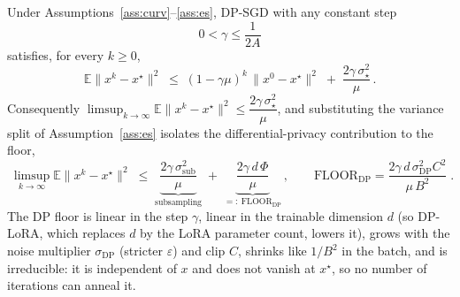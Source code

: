 \begin{theorem}\label{thm:floor}
Under Assumptions~\ref{ass:curv}--\ref{ass:es}, DP-SGD with any constant step
\[
0<\gamma\le\frac{1}{2A}
\]
satisfies, for every $k\ge0$,
\[
\mathbb E\|x^k-x^\star\|^2\;\le\;(1-\gamma\mu)^k\,\|x^0-x^\star\|^2\;+\;\frac{2\gamma\,\sigma_\star^2}{\mu}\,.
\]
Consequently $\limsup_{k\to\infty}\mathbb E\|x^k-x^\star\|^2\le \dfrac{2\gamma\,\sigma_\star^2}{\mu}$, and substituting the variance split of Assumption~\ref{ass:es} isolates the differential-privacy contribution to the floor,
\[
\boxed{\;\limsup_{k\to\infty}\mathbb E\|x^k-x^\star\|^2
\;\le\;\underbrace{\frac{2\gamma\,\sigma_{\mathrm{sub}}^2}{\mu}}_{\text{subsampling}}
\;+\;\underbrace{\frac{2\gamma\,d\,\Phi}{\mu}}_{=:\ \mathrm{FLOOR}_{\mathrm{DP}}}\,,
\qquad
\mathrm{FLOOR}_{\mathrm{DP}}=\frac{2\gamma\,d\,\sigma_{\mathrm{DP}}^2 C^2}{\mu\,B^2}\;}.
\]
The DP floor is linear in the step $\gamma$, linear in the trainable dimension $d$ (so DP-LoRA, which replaces $d$ by the LoRA parameter count, lowers it), grows with the noise multiplier $\sigma_{\mathrm{DP}}$ (stricter $\varepsilon$) and clip $C$, shrinks like $1/B^2$ in the batch, and is irreducible: it is independent of $x$ and does not vanish at $x^\star$, so no number of iterations can anneal it.
\end{theorem}

